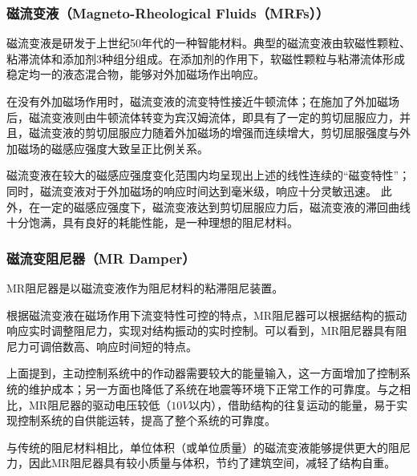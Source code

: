 \subsubsection{磁流变液（Magneto-Rheological Fluids（MRFs））}
磁流变液是研发于上世纪50年代的一种智能材料。典型的磁流变液由软磁性颗粒、粘滞流体和添加剂3种组分组成。在添加剂的作用下，软磁性颗粒与粘滞流体形成稳定均一的液态混合物，能够对外加磁场作出响应。

在没有外加磁场作用时，磁流变液的流变特性接近牛顿流体；在施加了外加磁场后，磁流变液则由牛顿流体转变为宾汉姆流体，即具有了一定的剪切屈服应力，并且，磁流变液的剪切屈服应力随着外加磁场的增强而连续增大，剪切屈服强度与外加磁场的磁感应强度大致呈正比例关系。

磁流变液在较大的磁感应强度变化范围内均呈现出上述的线性连续的“磁变特性”；同时，磁流变液对于外加磁场的响应时间达到毫米级，响应十分灵敏迅速\cite{Ali2015}。
此外，在一定的磁感应强度下，磁流变液达到剪切屈服应力后，磁流变液的滞回曲线十分饱满，具有良好的耗能性能，是一种理想的阻尼材料。

\subsubsection{磁流变阻尼器（MR Damper）}
MR阻尼器是以磁流变液作为阻尼材料的粘滞阻尼装置。

根据磁流变液在磁场作用下流变特性可控的特点，MR阻尼器可以根据结构的振动响应实时调整阻尼力，实现对结构振动的实时控制。可以看到，MR阻尼器具有阻尼力可调倍数高、响应时间短的特点\cite{Zhang2010}。

上面提到，主动控制系统中的作动器需要较大的能量输入，这一方面增加了控制系统的维护成本；另一方面也降低了系统在地震等环境下正常工作的可靠度。与之相比，MR阻尼器的驱动电压较低（$10V$以内），借助结构的往复运动的能量，易于实现控制系统的自供能运转，提高了整个系统的可靠度。

与传统的阻尼材料相比，单位体积（或单位质量）的磁流变液能够提供更大的阻尼力，因此MR阻尼器具有较小质量与体积，节约了建筑空间，减轻了结构自重。


